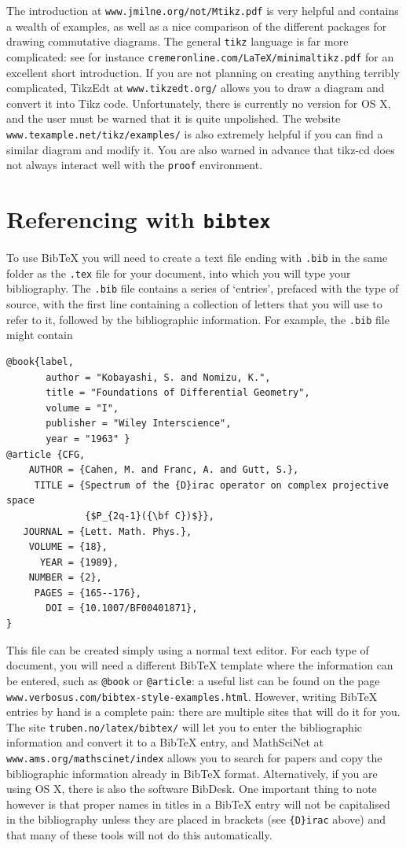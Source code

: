 \documentclass[10pt]{article}
\begin{document}
The introduction at \texttt{www.jmilne.org/not/Mtikz.pdf} is very helpful and contains a wealth of examples, as well as a nice comparison of the different packages for drawing commutative diagrams. The general \texttt{tikz} language is far more complicated: see for instance \verb$cremeronline.com/LaTeX/minimaltikz.pdf$ for an excellent short introduction. If you are not planning on creating anything terribly complicated, TikzEdt at \verb$www.tikzedt.org/$ allows you to draw a diagram and convert it into Tikz code. Unfortunately, there is currently no version for OS X, and the user must be warned that it is quite unpolished. The website \verb$www.texample.net/tikz/examples/$ is also extremely helpful if you can find a similar diagram and modify it. You are also warned in advance that tikz-cd does not always interact well with the \texttt{proof} environment. 

\section{Referencing with \texttt{bibtex}}

To use BibTeX you will need to create a text file ending with \verb$.bib$ in the same folder as the \verb$.tex$ file for your document, into which you will type your bibliography. The \verb$.bib$ file contains a series of `entries', prefaced with the type of source, with the first line containing a collection of letters that you will use to refer to it, followed by the bibliographic information. For example, the \verb$.bib$ file might contain
\begin{verbatim}
@book{label,
       author = "Kobayashi, S. and Nomizu, K.",
       title = "Foundations of Differential Geometry",
       volume = "I",
       publisher = "Wiley Interscience",
       year = "1963" }
@article {CFG,
    AUTHOR = {Cahen, M. and Franc, A. and Gutt, S.},
     TITLE = {Spectrum of the {D}irac operator on complex projective space
              {$P_{2q-1}({\bf C})$}},
   JOURNAL = {Lett. Math. Phys.},
    VOLUME = {18},
      YEAR = {1989},
    NUMBER = {2},
     PAGES = {165--176},
       DOI = {10.1007/BF00401871},
}	
\end{verbatim}

This file can be created simply using a normal text editor. For each type of document, you will need a different BibTeX template where the information can be entered, such as \verb$@book$ or \verb$@article$: a useful list can be found on the page \verb$www.verbosus.com/bibtex-style-examples.html$. However, writing BibTeX entries by hand is a complete pain: there are multiple sites that will do it for you. The site \verb$truben.no/latex/bibtex/$ will let you to enter the bibliographic information and convert it to a BibTeX entry, and MathSciNet at \verb$www.ams.org/mathscinet/index$ allows you to search for papers and copy the bibliographic information already in BibTeX format. Alternatively, if you are using OS X, there is also the software BibDesk. One important thing to note however is that proper names in titles in a BibTeX entry will not be capitalised in the bibliography unless they are placed in brackets (see \verb${D}irac$ above) and that many of these tools will not do this automatically.
\end{document}
